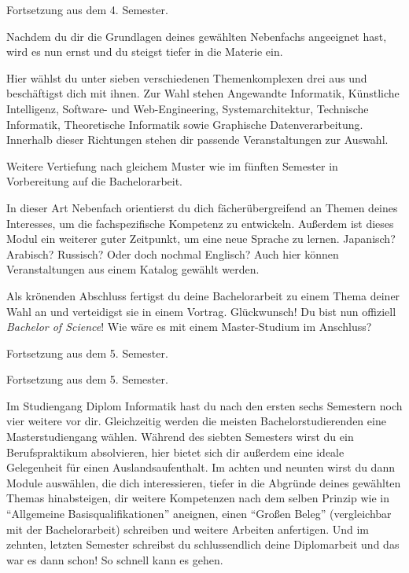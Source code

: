 Fortsetzung aus dem 4. Semester.

Nachdem du dir die Grundlagen deines gewählten Nebenfachs angeeignet hast, wird es nun ernst und du steigst tiefer in die Materie ein.

Hier wählst du unter sieben verschiedenen Themenkomplexen drei aus und beschäftigst dich mit ihnen.
Zur Wahl stehen Angewandte Informatik, Künstliche Intelligenz, Software- und Web-Engineering, Systemarchitektur, Technische Informatik, Theoretische Informatik sowie Graphische Datenverarbeitung.
Innerhalb dieser Richtungen stehen dir passende Veranstaltungen zur Auswahl.


Weitere Vertiefung nach gleichem Muster wie im fünften Semester in Vorbereitung auf die Bachelorarbeit.

In dieser Art Nebenfach orientierst du dich fächerübergreifend an Themen deines Interesses, um die fachspezifische Kompetenz zu entwickeln.
Außerdem ist dieses Modul ein weiterer guter Zeitpunkt, um eine neue Sprache zu lernen. Japanisch? Arabisch? Russisch? Oder doch nochmal Englisch?
Auch hier können Veranstaltungen aus einem Katalog gewählt werden.

\newpage

Als krönenden Abschluss fertigst du deine Bachelorarbeit zu einem Thema deiner Wahl an und verteidigst sie in einem Vortrag.
Glückwunsch! Du bist nun offiziell \textit{Bachelor of Science}! Wie wäre es mit einem Master-Studium im Anschluss?

Fortsetzung aus dem 5. Semester.

Fortsetzung aus dem 5. Semester.


Im Studiengang Diplom Informatik hast du nach den ersten sechs Semestern noch vier weitere vor dir. Gleichzeitig werden die meisten Bachelorstudierenden eine Masterstudiengang wählen.
Während des siebten Semesters wirst du ein Berufspraktikum absolvieren, hier bietet sich dir außerdem eine ideale Gelegenheit für einen Auslandsaufenthalt.
Im achten und neunten wirst du dann Module auswählen, die dich interessieren, tiefer in die Abgründe deines gewählten Themas hinabsteigen, dir weitere Kompetenzen nach dem selben Prinzip wie in \enquote{Allgemeine Basisqualifikationen} aneignen, einen \enquote{Großen Beleg} (vergleichbar mit der Bachelorarbeit) schreiben und weitere Arbeiten anfertigen.
Und im zehnten, letzten Semester schreibst du schlussendlich deine Diplomarbeit und das war es dann schon!
So schnell kann es gehen.

